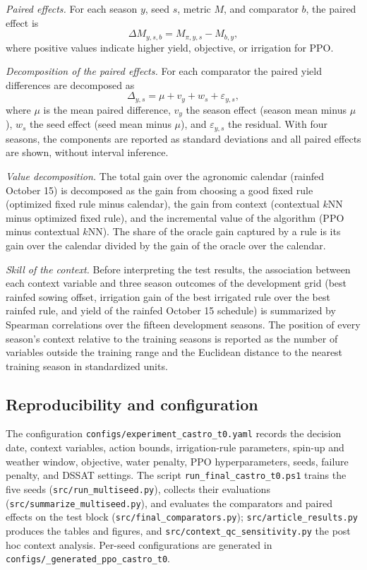 \documentclass[times,final,authoryear]{elsarticle}
\begin{document}
\emph{Paired effects.} For each season $y$, seed $s$, metric $M$, and comparator $b$, the paired effect is
\begin{equation}
\Delta M_{y,s,b} = M_{\pi,y,s} - M_{b,y},
\label{eq_paired}
\end{equation}
where positive values indicate higher yield, objective, or irrigation for PPO.

\emph{Decomposition of the paired effects.} For each comparator the paired yield differences are decomposed as
\begin{equation}
\Delta_{y,s} = \mu + v_y + w_s + \varepsilon_{y,s},
\label{eq_mixed}
\end{equation}
where $\mu$ is the mean paired difference, $v_y$ the season effect (season mean minus $\mu$), $w_s$ the seed effect (seed mean minus $\mu$), and $\varepsilon_{y,s}$ the residual. With four seasons, the components are reported as standard deviations and all paired effects are shown, without interval inference.

\emph{Value decomposition.} The total gain over the agronomic calendar (rainfed October 15) is decomposed as the gain from choosing a good fixed rule (optimized fixed rule minus calendar), the gain from context (contextual $k$NN minus optimized fixed rule), and the incremental value of the algorithm (PPO minus contextual $k$NN). The share of the oracle gain captured by a rule is its gain over the calendar divided by the gain of the oracle over the calendar.

\emph{Skill of the context.} Before interpreting the test results, the association between each context variable and three season outcomes of the development grid (best rainfed sowing offset, irrigation gain of the best irrigated rule over the best rainfed rule, and yield of the rainfed October 15 schedule) is summarized by Spearman correlations over the fifteen development seasons. The position of every season's context relative to the training seasons is reported as the number of variables outside the training range and the Euclidean distance to the nearest training season in standardized units.

\subsection{Reproducibility and configuration}
\label{subrepro}

The configuration \texttt{configs/experiment\_castro\_t0.yaml} records the decision date, context variables, action bounds, irrigation-rule parameters, spin-up and weather window, objective, water penalty, PPO hyperparameters, seeds, failure penalty, and DSSAT settings. The script \texttt{run\_final\_castro\_t0.ps1} trains the five seeds (\texttt{src/run\_multiseed.py}), collects their evaluations (\texttt{src/summarize\_multiseed.py}), and evaluates the comparators and paired effects on the test block (\texttt{src/final\_comparators.py}); \texttt{src/article\_results.py} produces the tables and figures, and \texttt{src/context\_qc\_sensitivity.py} the post hoc context analysis. Per-seed configurations are generated in \texttt{configs/\_generated\_ppo\_castro\_t0}.
\end{document}
